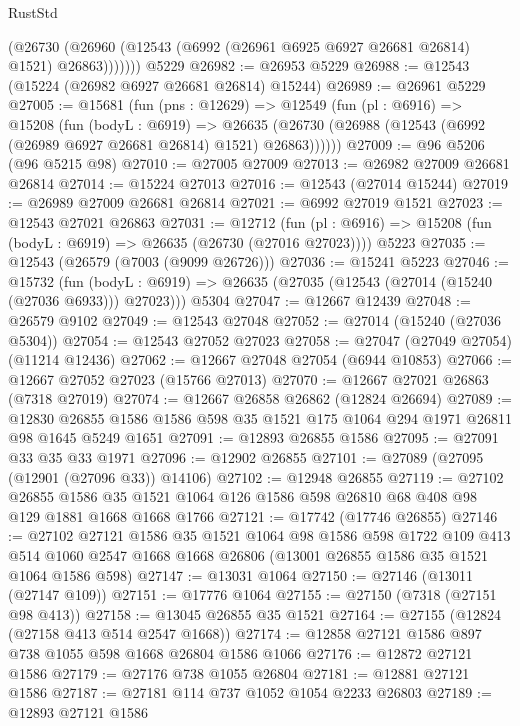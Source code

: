 \begin{lexlean}{RustStd}
\begin{coremodule}
            (@26730 (@26960 (@12543 (@6992 (@26961 @6925 @6927 @26681 @26814) @1521) @26863)))))))
    @5229
@26982 := @26953 @5229
@26988 := @12543 (@15224 (@26982 @6927 @26681 @26814) @15244)
@26989 := @26961 @5229
@27005 := @15681
    (fun (pns : @12629) =>
    @12549
      (fun (pl : @6916) =>
      @15208
        (fun (bodyL : @6919) =>
        @26635 (@26730 (@26988 (@12543 (@6992 (@26989 @6927 @26681 @26814) @1521) @26863))))))
@27009 := @96 @5206 (@96 @5215 @98)
@27010 := @27005 @27009
@27013 := @26982 @27009 @26681 @26814
@27014 := @15224 @27013
@27016 := @12543 (@27014 @15244)
@27019 := @26989 @27009 @26681 @26814
@27021 := @6992 @27019 @1521
@27023 := @12543 @27021 @26863
@27031 := @12712
    (fun (pl : @6916) => @15208 (fun (bodyL : @6919) => @26635 (@26730 (@27016 @27023))))
    @5223
@27035 := @12543 (@26579 (@7003 (@9099 @26726)))
@27036 := @15241 @5223
@27046 := @15732
    (fun (bodyL : @6919) => @26635 (@27035 (@12543 (@27014 (@15240 (@27036 @6933))) @27023)))
    @5304
@27047 := @12667 @12439
@27048 := @26579 @9102
@27049 := @12543 @27048
@27052 := @27014 (@15240 (@27036 @5304))
@27054 := @12543 @27052 @27023
@27058 := @27047 (@27049 @27054) (@11214 @12436)
@27062 := @12667 @27048 @27054 (@6944 @10853)
@27066 := @12667 @27052 @27023 (@15766 @27013)
@27070 := @12667 @27021 @26863 (@7318 @27019)
@27074 := @12667 @26858 @26862 (@12824 @26694)
@27089 := @12830
    @26855
    @1586
    @1586
    @598
    @35
    @1521
    @175
    @1064
    @294
    @1971
    @26811
    @98
    @1645
    @5249
    @1651
@27091 := @12893 @26855 @1586
@27095 := @27091 @33 @35 @33 @1971
@27096 := @12902 @26855
@27101 := @27089 (@27095 (@12901 (@27096 @33)) @14106)
@27102 := @12948 @26855
@27119 := @27102
    @26855
    @1586
    @35
    @1521
    @1064
    @126
    @1586
    @598
    @26810
    @68
    @408
    @98
    @129
    @1881
    @1668
    @1668
    @1766
@27121 := @17742 (@17746 @26855)
@27146 := @27102
    @27121
    @1586
    @35
    @1521
    @1064
    @98
    @1586
    @598
    @1722
    @109
    @413
    @514
    @1060
    @2547
    @1668
    @1668
    @26806
    (@13001 @26855 @1586 @35 @1521 @1064 @1586 @598)
@27147 := @13031 @1064
@27150 := @27146 (@13011 (@27147 @109))
@27151 := @17776 @1064
@27155 := @27150 (@7318 (@27151 @98 @413))
@27158 := @13045 @26855 @35 @1521
@27164 := @27155 (@12824 (@27158 @413 @514 @2547 @1668))
@27174 := @12858 @27121 @1586 @897 @738 @1055 @598 @1668 @26804 @1586 @1066
@27176 := @12872 @27121 @1586
@27179 := @27176 @738 @1055 @26804
@27181 := @12881 @27121 @1586
@27187 := @27181 @114 @737 @1052 @1054 @2233 @26803
@27189 := @12893 @27121 @1586

\end{coremodule}
\end{lexlean}
